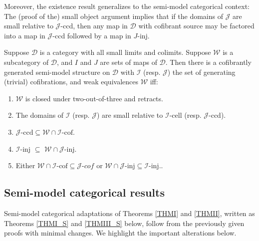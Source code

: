 \documentclass[a4paper,10pt
]{article}%
\renewcommand{\1}{\eta}%
\begin{document}
Moreover, the existence result \cite[Theorem 2.1.19]{Hov99} generalizes to the semi-model categorical context:
The (proof of the) small object argument \cite[Lemma 2.1.14]{Hov99} implies that
if the domains of $\mathcal J$ are small relative to $\mathcal J$-ccd,
then any map in $\mathcal D$ with cofibrant source may be factored into a map in $\mathcal J$-ccd followed by a map in $J$-inj.
\begin{theorem}\label{SEMIMS_THM}
	Suppose $\mathcal D$ is a category with all small limits and colimits.
	Suppose $\mathcal W$ is a subcategory of $\mathcal D$, and $I$ and $J$ are sets of maps of $\mathcal D$.
	Then there is a cofibrantly generated semi-model structure on $\mathcal D$ with
	$\mathcal I$ (resp. $\mathcal J$) the set of generating (trivial) cofibrations, and weak equivalences $\mathcal W$ iff:
	\begin{enumerate}[label = (\roman*)]
		\item $\mathcal W$ is closed under two-out-of-three and retracts.
		\item The domains of $\mathcal I$ (resp. $\mathcal J$) are small relative to $\mathcal I$-cell (resp. $\mathcal J$-ccd).
		\item $\mathcal J\text{-ccd} \subseteq \mathcal W \cap \mathcal I\text{-cof}$.
		\item $\mathcal I$-inj $\subseteq$ $\mathcal W \cap \mathcal J$-inj.
		\item Either $\mathcal W \cap \mathcal I\text{-cof} \subseteq \mathcal J\textit{-cof}$
                      or $\mathcal W \cap \mathcal J\text{-inj} \subseteq \mathcal I\text{-inj}.$.
	\end{enumerate}
\end{theorem}


\subsection{Semi-model categorical results}

Semi-model categorical adaptations of Theorems \ref{THMI} and \ref{THMII}, written as Theorems \ref{THMI_S} and \ref{THMIII_S} below,
follow from the previously given proofs with minimal changes.
We highlight the important alterations below.
\end{document}
